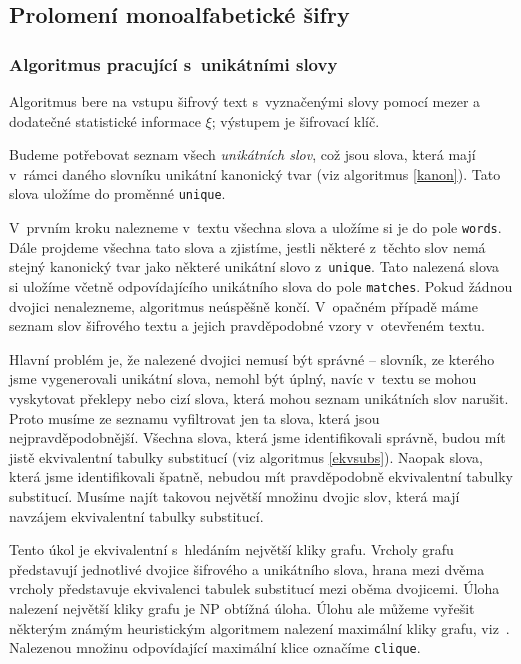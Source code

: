 \documentclass[12pt]{article}
\theoremstyle{definition}
\newcommand{\var}[1]{\texttt{#1}}
\newcommand{\stats}{\xi}
\begin{document}

\subsection{Prolomení monoalfabetické šifry}
\subsubsection{Algoritmus pracující s~unikátními slovy}
\label{monoattack}
Algoritmus bere na vstupu šifrový text s~vyznačenými slovy pomocí mezer a dodatečné statistické informace $\stats$; výstupem je šifrovací klíč. 

Budeme potřebovat seznam všech {\em unikátních slov}, což jsou slova, která mají v~rámci daného slovníku unikátní kanonický tvar (viz algoritmus \ref{kanon}). Tato slova uložíme do proměnné \var{unique}. 

V~prvním kroku nalezneme v~textu všechna slova a uložíme si je do pole \var{words}. Dále projdeme všechna tato slova a zjistíme, jestli některé z~těchto slov nemá stejný kanonický tvar jako některé unikátní slovo z~\var{unique}. Tato nalezená slova si uložíme včetně odpovídajícího unikátního slova do pole \var{matches}. Pokud žádnou dvojici nenalezneme, algoritmus neúspěšně končí. V~opačném případě máme seznam slov šifrového textu a jejich pravděpodobné vzory v~otevřeném textu. 

Hlavní problém je, že nalezené dvojici nemusí být správné -- slovník, ze kterého jsme vygenerovali unikátní slova, nemohl být úplný, navíc v~textu se mohou vyskytovat překlepy nebo cizí slova, která mohou seznam unikátních slov narušit. Proto musíme ze seznamu vyfiltrovat jen ta slova, která jsou nejpravděpodobnější. Všechna slova, která jsme identifikovali správně, budou mít jistě ekvivalentní tabulky substitucí (viz algoritmus \ref{ekvsubs}). Naopak slova, která jsme identifikovali špatně, nebudou mít pravděpodobně ekvivalentní tabulky substitucí. Musíme najít takovou největší množinu dvojic slov, která mají navzájem ekvivalentní tabulky substitucí. 

Tento úkol je ekvivalentní s~hledáním největší kliky grafu. Vrcholy grafu představují jednotlivé dvojice šifrového a unikátního slova, hrana mezi dvěma vrcholy představuje ekvivalenci tabulek substitucí mezi oběma dvojicemi. Úloha nalezení největší kliky grafu je NP obtížná úloha. Úlohu ale můžeme vyřešit některým známým heuristickým algoritmem nalezení maximální kliky grafu, viz~\cite{grafy}. Nalezenou množinu odpovídající maximální klice označíme \var{clique}. 
\end{document}

